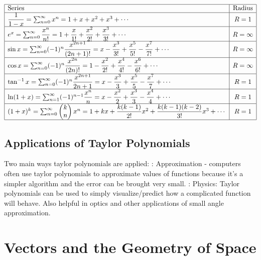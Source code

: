 \documentclass{article}
\begin{document}
    $$\begin{array}{ | l | c | }
        \hline
        \text{Series} & \text{Radius} \\
        \hline
        \dfrac{1}{1-x}=\sum^\infty_{n=0}x^n=1+x+x^2+x^3+\cdots & R=1 \\
        \hline
        e^x= \sum^\infty_{n=0}\dfrac{x^n}{n!}=1+\dfrac{x}{1!}+\dfrac{x^2}{2!}+\dfrac{x^3}{3!}+\cdots & R=\infty \\
        \hline
        \sin x=\sum^\infty_{n=0}(-1)^n\dfrac{x^{2n+1}}{(2n+1)!}=x-\dfrac{x^3}{3!}+\dfrac{x^5}{5!}-\dfrac{x^7}{7!}+\cdots  & R=\infty \\
        \hline
        \cos x=\sum^\infty_{n=0}(-1)^n\dfrac{x^{2n}}{(2n)!}=1-\dfrac{x^2}{2!}+\dfrac{x^4}{4!}-\dfrac{x^6}{6!}+\cdots  & R=\infty \\
        \hline
        \tan^{-1}x=\sum^\infty_{n=0}(-1)^n\dfrac{x^{2n+1}}{2n+1}=x-\dfrac{x^3}{3}+\dfrac{x^5}{5}-\dfrac{x^7}{7}+\cdots  & R=1 \\
        \hline
        \ln(1+x)=\sum^\infty_{n=1}(-1)^{n-1}\dfrac{x^n}{n}=x-\dfrac{x^2}{2}+\dfrac{x^3}{3}-\dfrac{x^4}{4}+\cdots  & R=1 \\ 
        \hline
        (1+x)^k=\sum^\infty_{n=0}\begin{pmatrix}k\\n\end{pmatrix}x^n=1+kx+\dfrac{k(k-1)}{2!}x^2+\dfrac{k(k-1)(k-2)}{3!}x^3+\cdots  & R=1 \\ 
        \hline     
    \end{array}$$
    
        
    \subsection{Applications of Taylor Polynomials}
    \begin{outline}
        \1 Two main ways taylor polynomials are applied: 
            : Approximation - computers often use taylor polynomials to approximate values of functions because it's a simpler algorithm and the error can be brought very small. 
            : Physics: Taylor polynomials can be used to simply visualize/predict how a complicated function will behave. Also helpful in optics and other applications of small angle approximation. 
    \end{outline}

    \section{Vectors and the Geometry of Space} %
\end{document}
